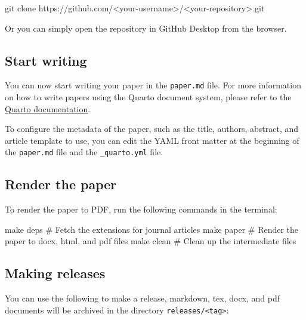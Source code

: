 \documentclass[
  authoryear,
  review,
  3p,
  onecolumn]{elsarticle}
\newenvironment{Shaded}{\begin{snugshade}}{\end{snugshade}}
\newcommand{\CommentTok}[1]{\textcolor[rgb]{0.37,0.37,0.37}{#1}}
\newcommand{\FunctionTok}[1]{\textcolor[rgb]{0.28,0.35,0.67}{#1}}
\newcommand{\NormalTok}[1]{\textcolor[rgb]{0.00,0.23,0.31}{#1}}
\newcommand{\OperatorTok}[1]{\textcolor[rgb]{0.37,0.37,0.37}{#1}}
\begin{document}
\begin{Shaded}
\begin{Highlighting}[]
\FunctionTok{git}\NormalTok{ clone https://github.com/}\OperatorTok{\textless{}}\NormalTok{your{-}username}\OperatorTok{\textgreater{}}\NormalTok{/}\OperatorTok{\textless{}}\NormalTok{your{-}repository}\OperatorTok{\textgreater{}}\NormalTok{.git}
\end{Highlighting}
\end{Shaded}

Or you can simply open the repository in GitHub Desktop from the
browser.

\subsection{Start writing}\label{start-writing}

You can now start writing your paper in the \texttt{paper.md} file. For
more information on how to write papers using the Quarto document
system, please refer to the \href{https://quarto.org/docs/guide/}{Quarto
documentation}.

To configure the metadata of the paper, such as the title, authors,
abstract, and article template to use, you can edit the YAML front
matter at the beginning of the \texttt{paper.md} file and the
\texttt{\_quarto.yml} file.

\subsection{Render the paper}\label{render-the-paper}

To render the paper to PDF, run the following commands in the terminal:

\begin{Shaded}
\begin{Highlighting}[]
\FunctionTok{make}\NormalTok{ deps   }\CommentTok{\# Fetch the extensions for journal articles}
\FunctionTok{make}\NormalTok{ paper  }\CommentTok{\# Render the paper to docx, html, and pdf files}
\FunctionTok{make}\NormalTok{ clean  }\CommentTok{\# Clean up the intermediate files}
\end{Highlighting}
\end{Shaded}

\subsection{Making releases}\label{making-releases}

You can use the following to make a release, markdown, tex, docx, and
pdf documents will be archived in the directory
\texttt{releases/\textless{}tag\textgreater{}}:
\end{document}
